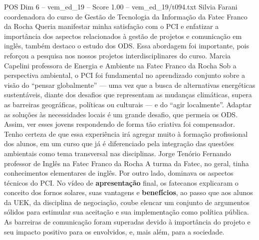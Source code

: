 \begin{textsample}{POS Dim 6 – vem\_ed\_19 – Score 1.00 – vem\_ed\_19/t094.txt}  \label{ex:f6_pos_114}
Silvia Farani coordenadora do curso de Gestão de Tecnologia da Informação da Fatec Franco da Rocha Queria manifestar minha satisfação com o PCI e enfatizar a importância dos aspectos relacionados à gestão de projetos e comunicação em inglês, também destaco o estudo dos ODS.
Essa abordagem foi importante, pois reforçou a pesquisa nos nossos projetos interdisciplinares do curso.
Marcia Capelini professora de Energia e Ambiente na Fatec Franco da Rocha Sob a perspectiva ambiental, o PCI foi fundamental no aprendizado conjunto sobre a visão do “pensar globalmente” — uma vez que a busca de alternativas energéticas sustentáveis, diante dos desafios que representam as mudanças climáticas, supera as barreiras geográficas, políticas ou culturais — e do “agir localmente”.
Adaptar as soluções às necessidades locais é um grande desafio, que permeia os ODS.
Assim, ver esses jovens respondendo de forma tão criativa foi compensador.
Tenho certeza de que essa experiência irá agregar muito à formação profissional dos alunos, em um curso que já é diferenciado pela integração das questões ambientais como tema transversal nas disciplinas.
Jorge Tenório Fernando professor de Inglês na Fatec Franco da Rocha A turma da Fatec, no geral, tinha conhecimentos elementares de inglês.
Por outro lado, dominava os aspectos técnicos do PCI.
No vídeo de \textbf{apresentação} final, os fatecanos explicaram o conceito dos fornos solares, suas vantagens e \textbf{benefícios}, ao passo que aos alunos da UEK, da disciplina de negociação, coube elencar um conjunto de argumentos sólidos para estimular sua aceitação e sua implementação como política pública.
As barreiras de comunicação foram superadas devido à importância do projeto e seu impacto positivo para os envolvidos, e, mais além, para a sociedade.

\end{textsample}
